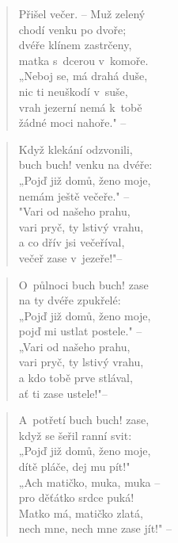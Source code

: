 \begin{verse}
Přišel večer. -- Muž zelený \\
chodí venku po dvoře; \\
dvéře klínem zastrčeny, \\
matka s~dcerou v~komoře. \\
„Neboj se, má drahá duše, \\
nic ti neuškodí v~suše, \\
vrah jezerní nemá k~tobě \\
žádné moci nahoře." --
\end{verse}

\begin{verse}
Když klekání odzvonili, \\
buch buch! venku na dvéře: \\
„Pojď již domů, ženo moje, \\
nemám ještě večeře." -- \\
"Vari od našeho prahu, \\
vari pryč, ty lstivý vrahu, \\
a co dřív jsi večeříval, \\
večeř zase v~jezeře!"--
\end{verse}

\begin{verse}
O~půlnoci buch buch! zase \\
na ty dvéře zpukřelé: \\
„Pojď již domů, ženo moje, \\
pojď mi ustlat postele." -- \\
„Vari od našeho prahu, \\
vari pryč, ty lstivý vrahu, \\
a kdo tobě prve stlával, \\
ať ti zase ustele!"--
\end{verse}

\begin{verse}
A~potřetí buch buch! zase, \\
když se šeřil ranní svit: \\
„Pojď již domů, ženo moje, \\
dítě pláče, dej mu pít!" \\
„Ach matičko, muka, muka -- \\
pro děťátko srdce puká! \\
Matko má, matičko zlatá, \\
nech mne, nech mne zase jít!" --
\end{verse}

